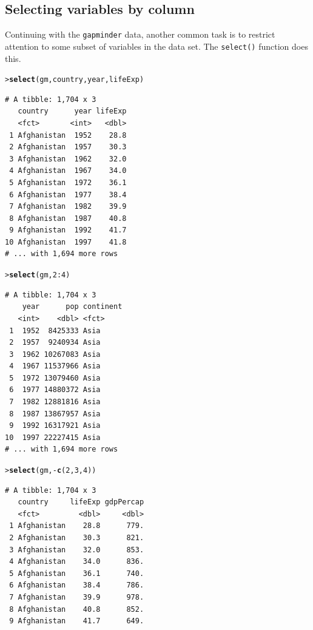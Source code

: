 \documentclass[12pt,oneside]{book}\usepackage[]{graphicx}\usepackage[]{color}
\makeatletter
\newcommand{\hlnum}[1]{\textcolor[rgb]{0.686,0.059,0.569}{#1}}%
\newcommand{\hlopt}[1]{\textcolor[rgb]{0,0,0}{#1}}%
\newcommand{\hlstd}[1]{\textcolor[rgb]{0.345,0.345,0.345}{#1}}%
\newcommand{\hlkwd}[1]{\textcolor[rgb]{0.737,0.353,0.396}{\textbf{#1}}}%
\newenvironment{kframe}{%
 \def\at@end@of@kframe{}%
 \ifinner\ifhmode%
  \def\at@end@of@kframe{\end{minipage}}%
  \begin{minipage}{\columnwidth}%
 \fi\fi%
 \def\FrameCommand##1{\hskip\@totalleftmargin \hskip-\fboxsep
 \colorbox{shadecolor}{##1}\hskip-\fboxsep
     \hskip-\linewidth \hskip-\@totalleftmargin \hskip\columnwidth}%
 \MakeFramed {\advance\hsize-\width
   \@totalleftmargin\z@ \linewidth\hsize
   \@setminipage}}%
 {\par\unskip\endMakeFramed%
 \at@end@of@kframe}
\newenvironment{knitrout}{}{} %
\newcommand{\Rfunc}[1]{\texttt{#1}}
\makeatother
\begin{document}
\subsection{Selecting variables by column}
Continuing with the \verb+gapminder+ data, another common task is to restrict attention to some subset of variables in the data set. The \Rfunc{select()} function does this.

\begin{knitrout}
\color{fgcolor}\begin{kframe}
\begin{alltt}
\hlstd{> }\hlkwd{select}\hlstd{(gm, country, year, lifeExp)}
\end{alltt}
\begin{verbatim}
# A tibble: 1,704 x 3
   country      year lifeExp
   <fct>       <int>   <dbl>
 1 Afghanistan  1952    28.8
 2 Afghanistan  1957    30.3
 3 Afghanistan  1962    32.0
 4 Afghanistan  1967    34.0
 5 Afghanistan  1972    36.1
 6 Afghanistan  1977    38.4
 7 Afghanistan  1982    39.9
 8 Afghanistan  1987    40.8
 9 Afghanistan  1992    41.7
10 Afghanistan  1997    41.8
# ... with 1,694 more rows
\end{verbatim}
\begin{alltt}
\hlstd{> }\hlkwd{select}\hlstd{(gm,} \hlnum{2}\hlopt{:}\hlnum{4}\hlstd{)}
\end{alltt}
\begin{verbatim}
# A tibble: 1,704 x 3
    year      pop continent
   <int>    <dbl> <fct>    
 1  1952  8425333 Asia     
 2  1957  9240934 Asia     
 3  1962 10267083 Asia     
 4  1967 11537966 Asia     
 5  1972 13079460 Asia     
 6  1977 14880372 Asia     
 7  1982 12881816 Asia     
 8  1987 13867957 Asia     
 9  1992 16317921 Asia     
10  1997 22227415 Asia     
# ... with 1,694 more rows
\end{verbatim}
\begin{alltt}
\hlstd{> }\hlkwd{select}\hlstd{(gm,} \hlopt{-}\hlkwd{c}\hlstd{(}\hlnum{2}\hlstd{,} \hlnum{3}\hlstd{,} \hlnum{4}\hlstd{))}
\end{alltt}
\begin{verbatim}
# A tibble: 1,704 x 3
   country     lifeExp gdpPercap
   <fct>         <dbl>     <dbl>
 1 Afghanistan    28.8      779.
 2 Afghanistan    30.3      821.
 3 Afghanistan    32.0      853.
 4 Afghanistan    34.0      836.
 5 Afghanistan    36.1      740.
 6 Afghanistan    38.4      786.
 7 Afghanistan    39.9      978.
 8 Afghanistan    40.8      852.
 9 Afghanistan    41.7      649.

\end{verbatim}
\end{kframe}
\end{knitrout}
\end{document}
